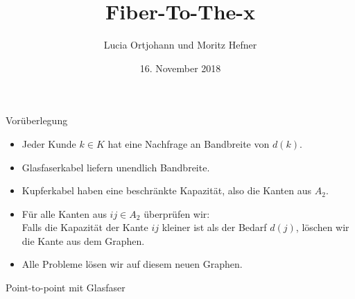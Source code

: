 \documentclass{beamer}
\title[Projekt 2]{Fiber-To-The-x}
\author{Lucia Ortjohann und Moritz Hefner}
\institute[]{Netzwerkoptimierung in der Praxis}
\date{16. November 2018}
\begin{document}
	\begin{frame} %
		\titlepage
	\end{frame}
	
	\begin{frame}{Vor\"uberlegung}
	\begin{itemize}
		\item Jeder Kunde \(k \in K\) hat  eine Nachfrage an Bandbreite von $d(k)$.
		\item Glasfaserkabel liefern unendlich Bandbreite.
		\item Kupferkabel haben eine beschr\"ankte Kapazit\"at, also die Kanten aus $A_2$.
		\vspace{0.8cm}
		\pause
		\item F\"ur alle Kanten aus $ij \in A_2$ \"uberpr\"ufen wir:\\
		Falls die Kapazit\"at der Kante $ij$ kleiner ist als der Bedarf  $d(j)$,
		l\"oschen wir die Kante aus dem Graphen.
		\item Alle Probleme l\"osen wir auf diesem neuen Graphen. 
	\end{itemize}
		
	\end{frame}
	\begin{frame}{Point-to-point mit Glasfaser}
	\end{frame}
	
\end{document}
